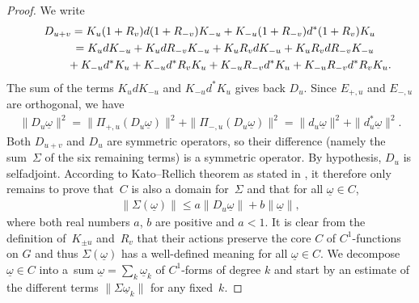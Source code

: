 \documentclass[pdftex]{sigma}
\newcommand{\Core}{C}
\newcommand{\omegat}{\underline{\omega}}
\numberwithin{equation}{section}
\begin{document}
\begin{proof}
We write
\begin{gather*}
D_{u+v} = K_{u} (1 + R_v) d (1+ R_{-v}) K_{-u} + K_{-u} (1+R_{-v}) d^* (1+R_v) K_{u} \\
\hphantom{D_{u+v}}{}
= K_u d K_{-u} + K_u d R_{-v} K_{-u} + K_u R_v d K_{-u} + K_u R_v d R_{-v} K_{-u} \\
\hphantom{D_{u+v}=}{}
+ K_{-u} d^* K_{u} + K_{-u} d^* R_v K_u + K_{-u} R_{-v} d^* K_u + K_{-u} R_{-v} d^* R_v K_u.
\end{gather*}
The sum of the terms $K_u d K_{-u}$ and $K_{-u} d^* K_{u}$ gives back $D_u$. Since $E_{+, u}$ and $E_{-,u}$ are orthogonal, we have
\begin{gather}
\label{Eqn:Pyth}
\| D_u \omegat \|^2 = \| \Pi_{+, u}( D_u \omegat ) \|^2 + \| \Pi_{-, u}( D_u \omegat ) \|^2 = \| d_{u} \omegat \|^2 + \| d_u^* \omegat \|^2.
\end{gather}
Both $D_{u+v}$ and $D_u$ are symmetric operators, so their dif\/ference (namely the sum~$\Sigma$ of the six remaining terms) is a symmetric operator. By hypothesis, $D_u$ is selfadjoint. According to Kato--Rellich theorem as stated in \cite[Theorem~X.12, p.~162]{ReedSimon2}, it therefore only remains to prove that~$\Core$ is also a domain for~$\Sigma$ and that for all $\omegat \in \Core$,
\begin{gather*}
\| \Sigma(\omegat) \| \leqslant a \| D_u \omegat \| + b \| \omegat \|,
\end{gather*}
where both real numbers $a$, $b$ are positive and $a < 1 $. It is clear from the def\/inition of~$K_{\pm u}$ and~$R_v$ that their actions preserve the core $\Core$ of $C^1$-functions on $G$ and thus $\Sigma(\omegat)$ has a well-def\/ined meaning for all $\omegat \in \Core$. We decompose $\omegat \in \Core$ into a~sum $\omegat = \sum_{k} \omegat_k$ of $C^1$-forms of degree $k$ and start by an estimate of the dif\/ferent terms $\| \Sigma \omegat_k \|$ for any f\/ixed~$k$.


\end{proof}
\end{document}
